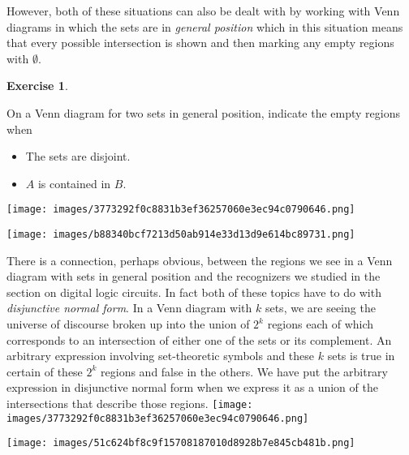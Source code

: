 \documentclass[10pt,]{book}
\theoremstyle{plain}
\theoremstyle{definition}
\theoremstyle{definition}
\newtheorem{exercise}[theorem]{Exercise}
\numberwithin{equation}{section}
\begin{document}
    However, both of these situations can also be dealt with
    by working with Venn diagrams in which the sets are in
     \emph{general position} \textemdash{} which
    in this situation means that every possible intersection is
    shown \textemdash{} and then marking any empty regions with \(\emptyset\).
\begin{exercise}\label{exercise-41}

      On a Venn diagram for two sets in general position, indicate
      the empty regions when

      \leavevmode%
\begin{itemize}[label=\textbullet]
\item{}
            The sets are disjoint.
\item{}
            \(A\) is contained in \(B\).
\end{itemize}

\texttt{[image: images/3773292f0c8831b3ef36257060e3ec94c0790646.png]}
\par

        \ifx\SetFigFont\undefined\gdef\SetFigFont#1#2#3#4#5{
        \reset@font\fontsize{#1}{#2pt}
        \fontfamily{#3}\fontseries{#4}\fontshape{#5}
        \selectfont}\fi
\texttt{[image: images/b88340bcf7213d50ab914e33d13d9e614bc89731.png]}
\end{exercise}
\par

    There is a connection, perhaps obvious, between the regions we
    see in a Venn diagram with sets in general position and the recognizers
    we studied in the section on digital logic circuits. In fact both
    of these topics have to do with \emph{disjunctive normal form}. In a Venn diagram with \(k\) sets, we are seeing the universe
    of discourse broken up into the union of \(2^k\) regions each of which
    corresponds to an intersection of either one of the sets or its complement.
    An arbitrary expression involving set-theoretic symbols and these \(k\) sets
    is true in certain of these \(2^k\) regions and false in the others.
    We have put the arbitrary expression in disjunctive normal form when
    we express it as a union of the intersections that describe those regions.
\texttt{[image: images/3773292f0c8831b3ef36257060e3ec94c0790646.png]}
\par

    \ifx\SetFigFont\undefined\gdef\SetFigFont#1#2#3#4#5{
    \reset@font\fontsize{#1}{#2pt}
    \fontfamily{#3}\fontseries{#4}\fontshape{#5}
    \selectfont}\fi
\texttt{[image: images/51c624bf8c9f15708187010d8928b7e845cb481b.png]}
\typeout{************************************************}
\typeout{************************************************}
\end{document}

